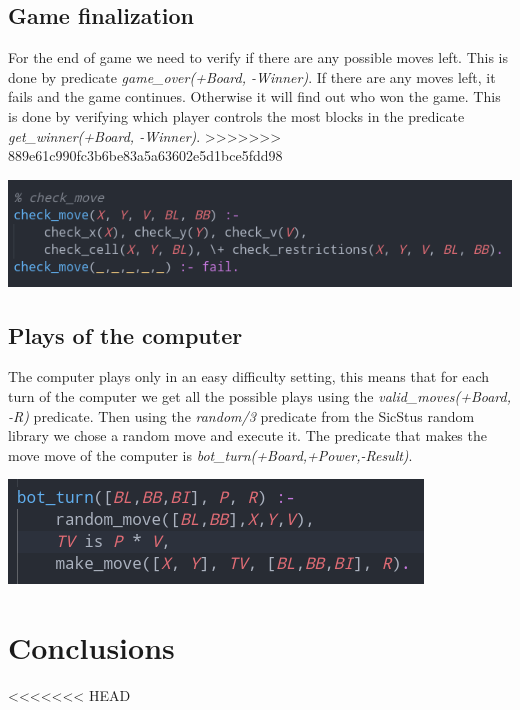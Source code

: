 \documentclass[a4paper]{article}
\begin{document}
\subsection{Game finalization} 
For the end of game we need to verify if there are any possible moves left. This is done by predicate \textit{game\_over(+Board, -Winner)}. If there are any moves left, it fails and the game continues.
Otherwise it will find out who won the game. This is done by verifying which player controls the most blocks in the predicate \textit{get\_winner(+Board, -Winner)}.
>>>>>>> 889e61c990fc3b6be83a5a63602e5d1bce5fdd98

\begin{center}
    \includegraphics[scale=0.4]{img/check_move.png}
\end{center}

\subsection{Plays of the computer} 
The computer plays only in an easy difficulty setting, this means that for each turn of the computer we get all the possible plays using 
the \textit{valid\_moves(+Board, -R)} predicate. Then using the \textit{random/3} predicate from the SicStus random library we chose a random 
move and execute it. The predicate that makes the move move of the computer is \textit{bot\_turn(+Board,+Power,-Result)}.

\begin{center}
    \includegraphics[scale=0.4]{img/bot_move.png}
\end{center}


\pagebreak
\section{Conclusions}
<<<<<<< HEAD
\end{document}
